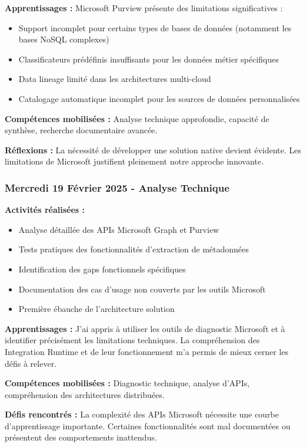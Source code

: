 \textbf{Apprentissages :}
Microsoft Purview présente des limitations significatives :
\begin{itemize}
    \item Support incomplet pour certains types de bases de données (notamment les bases NoSQL complexes)
    \item Classificateurs prédéfinis insuffisants pour les données métier spécifiques
    \item Data lineage limité dans les architectures multi-cloud
    \item Catalogage automatique incomplet pour les sources de données personnalisées
\end{itemize}

\textbf{Compétences mobilisées :}
Analyse technique approfondie, capacité de synthèse, recherche documentaire avancée.

\textbf{Réflexions :}
La nécessité de développer une solution native devient évidente. Les limitations de Microsoft justifient pleinement notre approche innovante.

\subsubsection{Mercredi 19 Février 2025 - Analyse Technique}

\textbf{Activités réalisées :}
\begin{itemize}
    \item Analyse détaillée des APIs Microsoft Graph et Purview
    \item Tests pratiques des fonctionnalités d'extraction de métadonnées
    \item Identification des gaps fonctionnels spécifiques
    \item Documentation des cas d'usage non couverts par les outils Microsoft
    \item Première ébauche de l'architecture solution
\end{itemize}

\textbf{Apprentissages :}
J'ai appris à utiliser les outils de diagnostic Microsoft et à identifier précisément les limitations techniques. La compréhension des Integration Runtime et de leur fonctionnement m'a permis de mieux cerner les défis à relever.

\textbf{Compétences mobilisées :}
Diagnostic technique, analyse d'APIs, compréhension des architectures distribuées.

\textbf{Défis rencontrés :}
La complexité des APIs Microsoft nécessite une courbe d'apprentissage importante. Certaines fonctionnalités sont mal documentées ou présentent des comportements inattendus.

